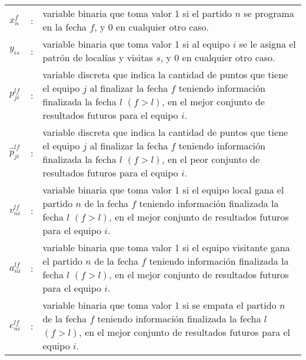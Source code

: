 \documentclass[authoryear,preprint,review,12pts]{elsarticle}
\begin{document}
\begin{tabular}{p{0.79cm}cp{13.5cm}}
$x_{n}^f$   & : & variable binaria que toma valor 1 si el partido $n$ se programa en la fecha $f$, y 0 en cualquier otro caso.\\
$y_{is}$    & : & variable binaria que toma valor 1 si al equipo $i$ se le asigna el patrón de localías y visitas $s$, y 0 en cualquier otro caso.\\
$p_{ji}^{lf}$  & : & variable discreta que indica la cantidad de puntos que tiene el equipo $j$ al finalizar la fecha $f$ teniendo información finalizada la fecha $l$ $(f > l)$, en el mejor conjunto de resultados futuros para el equipo $i$.\\
$\hat{p}_{ji}^{lf}$  & : & variable discreta que indica la cantidad de puntos que tiene el equipo $j$ al finalizar la fecha $f$ teniendo información finalizada la fecha $l$ $(f > l)$, en el peor conjunto de resultados futuros para el equipo $i$.\\
$v_{ni}^{lf}$  & : & variable binaria que toma valor 1 si el equipo local gana el partido $n$ de la fecha $f$ teniendo información finalizada la fecha $l$ $(f > l)$, en el mejor conjunto de resultados futuros para el equipo $i$.\\
$a_{ni}^{lf}$  & : & variable binaria que toma valor 1 si el equipo visitante gana el partido $n$ de la fecha $f$ teniendo información finalizada la fecha $l$ $(f > l)$, en el mejor conjunto de resultados futuros para el equipo $i$.\\
$e_{ni}^{lf}$  & : & variable binaria que toma valor 1 si se empata el partido $n$ de la fecha $f$ teniendo información finalizada la fecha $l$ $(f > l)$, en el mejor conjunto de resultados futuros para el equipo $i$.\\
\end{tabular}
\end{document}
